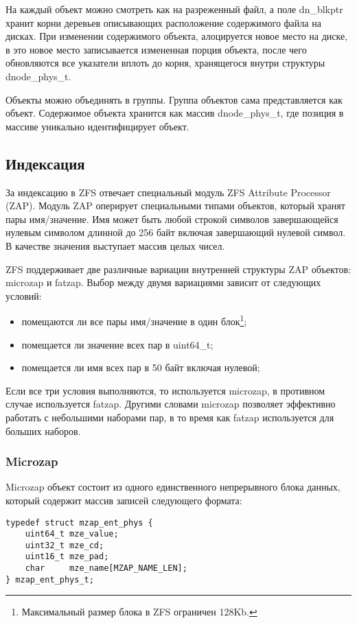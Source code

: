 На каждый объект можно смотреть как на разреженный файл, а поле dn\_blkptr
хранит корни деревьев описывающих расположение содержимого файла на дисках.
При изменении содержимого объекта, алоцируется новое место на диске, в это
новое место записывается измененная порция объекта, после чего обновляются все
указатели вплоть до корня, хранящегося внутри структуры dnode\_phys\_t.

Объекты можно объединять в группы. Группа объектов сама представляется как
объект. Содержимое объекта хранится как массив dnode\_phys\_t, где позиция в
массиве уникально идентифицирует объект.

\subsection{Индексация}

За индексацию в ZFS отвечает специальный модуль ZFS Attribute Processor (ZAP).
Модуль ZAP оперирует специальными типами объектов, который хранят пары
имя/значение. Имя может быть любой строкой символов завершающейся нулевым
символом длинной до 256 байт включая завершающий нулевой символ. В качестве
значения выступает массив целых чисел.

ZFS поддерживает две различные вариации внутренней структуры ZAP объектов:
microzap и fatzap. Выбор между двумя вариациями зависит от следующих условий:

\begin{itemize}
  \item помещаются ли все пары имя/значение в один блок\footnote{Максимальный
        размер блока в ZFS ограничен 128Kb.};
  \item помещается ли значение всех пар в uint64\_t;
  \item помещается ли имя всех пар в 50 байт включая нулевой;
\end{itemize}

Если все три условия выполняются, то используется microzap, в противном случае
используется fatzap. Другими словами microzap позволяет эффективно работать с
небольшими наборами пар, в то время как fatzap используется для больших наборов.

\subsubsection{Microzap}

Microzap объект состоит из одного единственного непрерывного блока данных,
который содержит массив записей следующего формата:
\begin{lstlisting}
typedef struct mzap_ent_phys {
    uint64_t mze_value;
    uint32_t mze_cd;
    uint16_t mze_pad;
    char     mze_name[MZAP_NAME_LEN];
} mzap_ent_phys_t;
\end{lstlisting}

